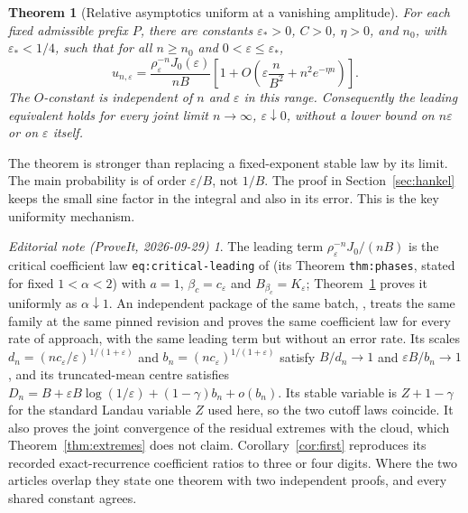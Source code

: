 \documentclass[11pt,a4paper]{article}
\newtheorem{theorem}{Theorem}[section]
\theoremstyle{definition}\newtheorem{definition}[theorem]{Definition}
\theoremstyle{remark}\newtheorem{remark}[theorem]{Remark}
\newtheorem*{ednote}{Editorial note (ProveIt, 2026-09-29)}
\newcommand{\eps}{\varepsilon}
\newcommand{\1}{\mathbf 1}
\begin{document}
\begin{theorem}[Relative asymptotics uniform at a vanishing amplitude]
\label{thm:uniform}
For each fixed admissible prefix $P$, there are constants
$\eps_*>0$, $C>0$, $\eta>0$, and $n_0$, with $\eps_*<1/4$, such that
for all $n\ge n_0$ and $0<\eps\le\eps_*$,
\begin{equation}\label{eq:uniform}
 u_{n,\eps}=
 \frac{\rho_{\eps}^{-n}J_0(\eps)}{nB}
 \left[1+O\left(\eps\frac n{B^2}+n^2e^{-\eta n}\right)\right].
\end{equation}
The $O$-constant is independent of $n$ and $\eps$ in this range.
Consequently the leading equivalent holds for \emph{every} joint limit
$n\to\infty$, $\eps\downarrow0$, without a lower bound on $n\eps$ or
on $\eps$ itself.
\end{theorem}

The theorem is stronger than replacing a fixed-exponent stable law by
its limit. The main probability is of order $\eps/B$, not $1/B$.
The proof in Section~\ref{sec:hankel} keeps the small sine factor in the
integral and also in its error. This is the key uniformity mechanism.
\begin{ednote}
The leading term $\rho_\eps^{-n}J_0/(nB)$ is the critical coefficient law
\texttt{eq:critical-leading} of \cite{repo-critical} (its Theorem
\texttt{thm:phases}, stated for fixed $1<\alpha<2$) with $a=1$,
$\beta_c=c_\eps$ and $B_{\beta_c}=K_\eps$; Theorem~\ref{thm:uniform}
proves it uniformly as $\alpha\downarrow1$.
An independent package of the same batch,
, treats the same
family at the same pinned revision and proves the same coefficient law for
every rate of approach, with the same leading term but without an error
rate. Its scales $d_n=(nc_\eps/\eps)^{1/(1+\eps)}$ and
$b_n=(nc_\eps)^{1/(1+\eps)}$ satisfy $B/d_n\to1$ and $\eps B/b_n\to1$, and
its truncated-mean centre satisfies
$D_n=B+\eps B\log(1/\eps)+(1-\gamma)b_n+o(b_n)$. Its stable variable is
$Z+1-\gamma$ for the standard Landau variable $Z$ used here, so the two
cutoff laws coincide. It also proves the joint convergence of the residual
extremes with the cloud, which Theorem~\ref{thm:extremes} does not claim.
Corollary~\ref{cor:first} reproduces its recorded exact-recurrence
coefficient ratios to three or four digits. Where the two articles overlap
they state one theorem with two independent proofs, and every shared
constant agrees.
\end{ednote}
\end{document}
